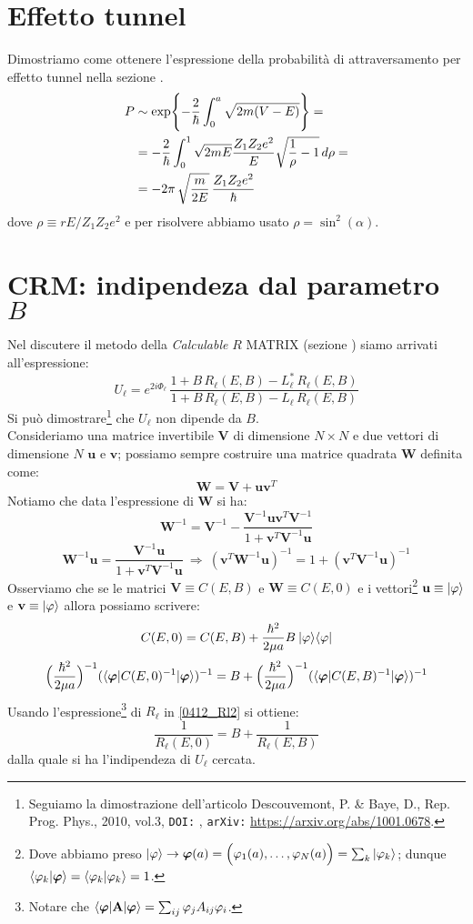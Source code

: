 \section{Effetto tunnel}\label{compl-tunnel}
Dimostriamo come ottenere l'espressione della probabilità di attraversamento per effetto tunnel nella sezione .
\begin{align*}
	P &\sim \exp\Biggl \{ -\frac{2}{\hbar}\int_0^a \sqrt{2m (V-E)} \Biggr \} = \\
	&= -\frac{2}{\hbar}\int_0^1 \sqrt{2mE}\frac{Z_1Z_2e^2}{E}\sqrt{\frac{1}{\rho}-1} \, d\rho = \\
	&= -2\pi \,\sqrt{\frac{m}{2E}} \, \frac{Z_1Z_2e^2}{\hbar}	
\end{align*} 
dove $\rho \equiv rE/Z_1Z_2e^2$ e per risolvere abbiamo usato $\rho = \sin^2(\alpha)$.


\section{CRM: indipendeza dal parametro $B$}\label{compl-CRM-dim}
Nel discutere il metodo della \textit{Calculable} $R$ MATRIX (sezione ) siamo arrivati all'espressione:
$$U_\ell = e^{2i\Phi_\ell} \, \frac{1+B\,R_\ell (E,B)-L_\ell^* \, R_\ell (E,B)}{1+B\,R_\ell(E,B)-L_\ell  \, R_\ell (E,B)}$$
Si può dimostrare\footnote{Seguiamo la dimostrazione dell'articolo Descouvemont, P. \& Baye, D., Rep. Prog. Phys., 2010, vol.3, \texttt{DOI:} , \texttt{arXiv:} \url{https://arxiv.org/abs/1001.0678}.} che $U_\ell$ non dipende da $B$.\\
Consideriamo una matrice invertibile $\mathbf{V}$ di dimensione  $N\times N$ e due vettori di dimensione $N$ $\mathbf{u}$ e $\mathbf{v}$; possiamo sempre costruire una matrice quadrata $\mathbf{W}$ definita come:
$$\mathbf{W} = \mathbf{V} + \mathbf{u}\mathbf{v}^T$$
Notiamo che data l'espressione di $\mathbf{W}$ si ha:
$$\mathbf{W}^{-1} = \mathbf{V}^{-1} - \frac{\mathbf{V}^{-1}\mathbf{u}\mathbf{v}^T\mathbf{V}^{-1}}{1+\mathbf{v}^T\mathbf{V}^{-1}\mathbf{u}}$$
$$\mathbf{W}^{-1}\mathbf{u} = \frac{\mathbf{V}^{-1}\mathbf{u}}{1+\mathbf{v}^T\mathbf{V}^{-1}\mathbf{u}} \: \Rightarrow \: (\mathbf{v}^T\mathbf{W}^{-1}\mathbf{u})^{-1} = 1 + (\mathbf{v}^T\mathbf{V}^{-1}\mathbf{u})^{-1} $$
Osserviamo che se le matrici $\mathbf{V}\equiv C(E,B)$ e $\mathbf{W}\equiv C(E,0)$ e i vettori\footnote{Dove abbiamo preso $|\varphi\rangle \to \bm{\varphi}(a) = \Bigl ( \varphi_1 (a),\dots,\varphi_N(a) \Bigr ) = \sum_k |\varphi_k\rangle$; dunque $\langle \varphi_k | \bm{\varphi} \rangle=\langle \varphi_k | \varphi_k \rangle=1$.} $\mathbf{u} \equiv |\varphi\rangle$ e $\mathbf{v} \equiv |\varphi\rangle$ allora possiamo scrivere:
$$C(E,0) = C(E,B) + \frac{\hbar^2}{2\mu a} B\: |\varphi\rangle\langle\varphi|$$
$$\Bigl ( \frac{\hbar^2}{2\mu a} \Bigr )^{-1}(\langle\bm{\varphi}|C(E,0)^{-1}|\bm{\varphi}\rangle)^{-1} = B + \Bigl ( \frac{\hbar^2}{2\mu a} \Bigr )^{-1}(\langle\bm{\varphi}|C(E,B)^{-1}|\bm{\varphi}\rangle)^{-1} $$
Usando l'espressione\footnote{Notare che $\langle\bm{\varphi}|\mathbf{A}|\bm{\varphi}\rangle = \sum_{ij} \varphi_j A_{ij} \varphi_i$.} di $R_\ell$ in \eqref{0412_Rl2} si ottiene:
$$\frac{1}{R_\ell (E,0)} = B+ \frac{1}{R_\ell (E,B)}$$
dalla quale si ha l'indipendeza di $U_\ell$ cercata.


